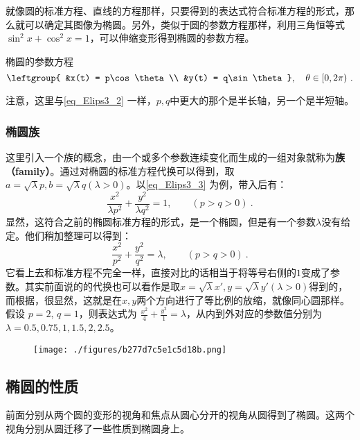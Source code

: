 就像圆的标准方程、直线的方程那样，只要得到的表达式符合标准方程的形式，那么就可以确定其图像为椭圆。另外，类似于圆的参数方程那样，利用三角恒等式$\sin^2x+\cos^2x=1$，可以伸缩变形得到椭圆的参数方程。

\begin{theorem}{椭圆的参数方程}
\begin{equation}\label{eq_Elips3_1}
\leftgroup{
&x(t) = p\cos \theta\\
&y(t) = q\sin \theta
},\quad \theta \in [0, 2\pi) ~.
\end{equation}
\end{theorem}
注意，这里与\autoref{eq_Elips3_2} 一样，$p,q$中更大的那个是半长轴，另一个是半短轴。

\subsubsection{椭圆族}

这里引入一个族的概念，由一个或多个参数连续变化而生成的一组对象就称为\textbf{族（family）}。通过对椭圆的标准方程代换可以得到，取$a=\sqrt{\lambda} p,b=\sqrt{\lambda} q(\lambda>0)$。以\autoref{eq_Elips3_3} 为例，带入后有：
\begin{equation}
\frac{x^2}{\lambda p^2} + \frac{y^2}{\lambda q^2} = 1,\qquad(p>q>0)~.
\end{equation}
显然，这符合之前的椭圆标准方程的形式，是一个椭圆，但是有一个参数$\lambda$没有给定。他们稍加整理可以得到：
\begin{equation}
\frac{x^2}{p^2} + \frac{y^2}{q^2} = \lambda,\qquad(p>q>0)~.
\end{equation}
它看上去和标准方程不完全一样，直接对比的话相当于将等号右侧的$1$变成了参数。其实前面说的的代换也可以看作是取$x=\sqrt{\lambda} x',y=\sqrt{\lambda} y'(\lambda>0)$得到的，而根据，很显然，这就是在$x,y$两个方向进行了等比例的放缩，就像同心圆那样。
假设 $p=2$, $q=1$，则表达式为 $\frac{x^2}{4} + \frac{y^2}{1} = \lambda$，从内到外对应的参数值分别为$\lambda = 0.5,0.75, 1,1.5,2,2.5$。
\begin{figure}[ht]
\centering
\texttt{[image: ./figures/b277d7c5e1c5d18b.png]}
\caption{} \label{fig_Elips3_6}
\end{figure}
\subsection{椭圆的性质}

前面分别从两个圆的变形的视角和焦点从圆心分开的视角从圆得到了椭圆。这两个视角分别从圆迁移了一些性质到椭圆身上。

